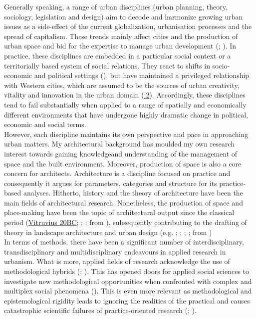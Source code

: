 \documentclass[11pt]{report}
\begin{document}
Generally speaking, a range of urban disciplines (urban planning, theory, sociology, legislation and design) aim to decode and harmonize growing urban issues as a side-effect of the current globalization, urbanisation processes and the spread of capitalism. These trends mainly affect cities and the production of urban space and bid for the expertise to manage urban development (\href{ref}{\citealt{allmendinger_planning_2009}}; \href{ref}{\citealt{faludi_planning_1973}}).
In practice, these disciplines are embedded in a particular social context or a territorially based system of social relations. They react to shifts in socio-economic and political settings  (\href{ref}{\citealt{tsenkova_beyond_2006}}), but have maintained a privileged relationship with Western cities, which are assumed to be the sources of urban creativity, vitality and innovation in the urban domain (\href{ref}{\citealt{robinson_ordinary_2006}:2}). Accordingly, these disciplines tend to fail substantially when applied to a range of spatially and economically different environments that have undergone highly dramatic change in political, economic and social terms. 
\\

However, each discipline maintains its own perspective and pace in approaching urban matters. My architectural background has moulded my own research interest towards gaining knowledgeand understanding of the management of space and the built environment. Moreover, production of space is also a core concern for architects. Architecture is a discipline focused on practice and consequently it argues for parameters, categories and structure for its practice-based analyses.  
Hitherto, history and the theory of architecture have been the main fields of architectural research. 
Nonetheless, the production of space and place-making have been the topic of architectural output since the classical period  (\href{ref}{Vitruvius 20BC}; \href{ref}{\citealt{rossi_architecture_1982}}; \href{ref}{\citealt{braunfels_urban_1990}}; from \href{van}{\citealt{van_assche_co-evolutions_2013}}), subsequently contributing to the drafting of theory in landscape architecture and urban design (e.g. \citealt{rossi_architecture_1982}; \citealt{lynch_good_1981}; \citealt{braunfels_urban_1990}; \citealt{childs_spectrum_2010}; from \citealt{van_assche_co-evolutions_2013})
\\

In terms of methods, there have been a significant number of interdisciplinary, transdisciplinary and multidisciplinary endeavours in applied research in urbanism. What is more, applied fields of research acknowledge the use of methodological hybrids (\href{ref}{\citealt{datta_paradigm_1994}}; \href{ref}{\citealt{de_lisle_benefits_2011}}). This has opened doors for applied social sciences to investigate new methodological opportunities when confronted with complex and multiplex social phenomena (\href{ref}{\citealt{de_lisle_benefits_2011}}). This is even more relevant as methodological and epistemological rigidity leads to ignoring the realities of the practical and causes catastrophic scientific failures of practice-oriented research (\href{ref}{\citealt{rogers_using_2008}}; \href{ref}{\citealt{de_lisle_benefits_2011}}).
\\
\end{document}
